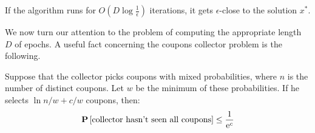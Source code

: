 \begin{corollary}
If the algorithm runs for $O(D \log \frac{1}{\epsilon})$ iterations, it gets $\epsilon$-close to the solution $x^*$.
\end{corollary}

We now turn our attention to the problem of computing the appropriate length $D$ of epochs. A useful fact concerning the coupons collector problem is the following.

\begin{lemma}
Suppose that the collector picks coupons with mixed probabilities, where $n$ is the number of distinct coupons.
Let $w$ be the minimum of these probabilities. If he selects $\ln n/w+ c/w$ coupons, then: 
$$
\bm{\mathrm{P}}\left[\text{collector hasn't seen all coupons}\right] \leq \frac{1}{\mathrm{e}^c}
$$
\end{lemma}

